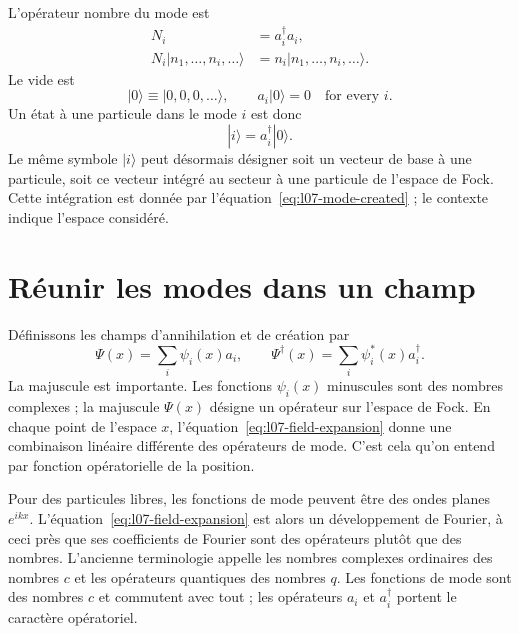 L’opérateur nombre du mode est
\begin{equation}
\begin{aligned}
N_i&=a_i^\dagger a_i,\\
N_i|n_1,\ldots,n_i,\ldots\rangle
&=n_i|n_1,\ldots,n_i,\ldots\rangle.
\end{aligned}
\end{equation}
Le vide est
\begin{equation}
|0\rangle\equiv|0,0,0,\ldots\rangle,
\qquad
a_i|0\rangle=0
\quad\text{for every }i.
\label{eq:l07-vacuum}
\end{equation}
Un état à une particule dans le mode \(i\) est donc
\begin{equation}
|i\rangle=a_i^\dagger|0\rangle.
\label{eq:l07-mode-created}
\end{equation}
Le même symbole \(|i\rangle\) peut désormais désigner soit un vecteur de base à une particule, soit ce vecteur intégré au secteur à une particule de l’espace de Fock. Cette intégration est donnée par l’équation~\eqref{eq:l07-mode-created} ; le contexte indique l’espace considéré.

\section{Réunir les modes dans un champ}

Définissons les champs d’annihilation et de création par
\begin{equation}
\Psi(x)=\sum_i \psi_i(x)a_i,
\qquad
\Psi^\dagger(x)=\sum_i \psi_i^*(x)a_i^\dagger.
\label{eq:l07-field-expansion}
\end{equation}
La majuscule est importante. Les fonctions \(\psi_i(x)\) minuscules sont des nombres complexes ; la majuscule \(\Psi(x)\) désigne un opérateur sur l’espace de Fock. En chaque point de l’espace \(x\), l’équation~\eqref{eq:l07-field-expansion} donne une combinaison linéaire différente des opérateurs de mode. C’est cela qu’on entend par fonction opératorielle de la position.

Pour des particules libres, les fonctions de mode peuvent être des ondes planes \(e^{ikx}\). L’équation~\eqref{eq:l07-field-expansion} est alors un développement de Fourier, à ceci près que ses coefficients de Fourier sont des opérateurs plutôt que des nombres. L’ancienne terminologie appelle les nombres complexes ordinaires des nombres \(c\) et les opérateurs quantiques des nombres \(q\). Les fonctions de mode sont des nombres \(c\) et commutent avec tout ; les opérateurs \(a_i\) et \(a_i^\dagger\) portent le caractère opératoriel.

